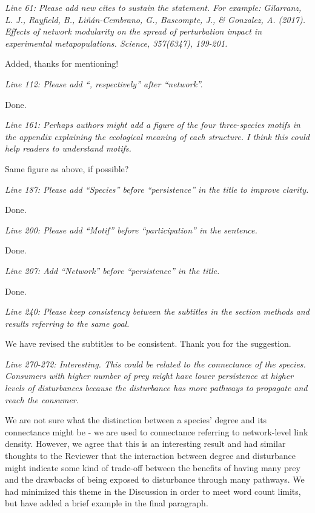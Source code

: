 \documentclass[12pt]{article}
\newcommand{\us}{\rm \setlength{\leftskip}{0.3cm} \setlength{\rightskip}{0.3cm}}
\newcommand{\them}{\it \setlength{\leftskip}{0cm} \setlength{\rightskip}{0cm}}
\begin{document}
\them
Line 61: Please add new cites to sustain the statement. For example:
Gilarranz, L. J., Rayfield, B., Liñán-Cembrano, G., Bascompte, J., \& Gonzalez, A. (2017). Effects of network modularity on the spread of perturbation impact in experimental metapopulations. Science, 357(6347), 199-201.

\us
Added, thanks for mentioning!

\them
Line 112: Please add “, respectively” after “network”.

\us
Done.

\them
Line 161: Perhaps authors might add a figure of the four three-species motifs in the appendix explaining the ecological meaning of each structure. I think this could help readers to understand motifs.

\us Same figure as above, if possible?

\them
Line 187: Please add “Species” before “persistence” in the title to improve clarity.

\us
Done.

\them
Line 200: Please add “Motif” before “participation” in the sentence.

\us
Done.

\them
Line 207: Add “Network” before “persistence” in the title.

\us
Done.

\them
Line 240: Please keep consistency between the subtitles in the section methods and results referring to the same goal.

\us We have revised the subtitles to be consistent. Thank you for the suggestion.

\them
Line 270-272: Interesting. This could be related to the connectance of the species. Consumers with higher number of prey might have lower persistence at higher levels of disturbances because the disturbance has more pathways to propagate and reach the consumer.

\us We are not sure what the distinction between a species' degree and its connectance might be - we are used to connectance referring to network-level link density. 
However, we agree that this is an interesting result and had similar thoughts to the Reviewer that the interaction between degree and disturbance might indicate some kind of trade-off between the benefits of having many prey and the drawbacks of being exposed to disturbance through many pathways.
We had minimized this theme in the Discussion in order to meet word count limits, but have added a brief example in the final paragraph.
\end{document}
